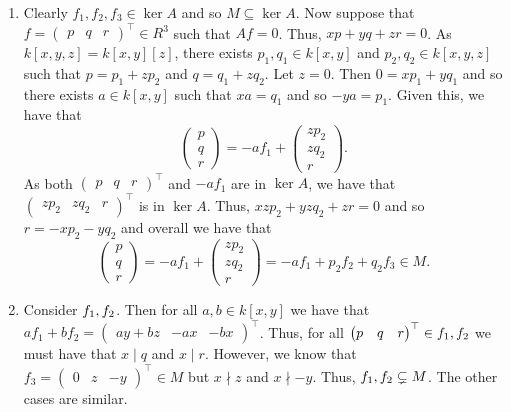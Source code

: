 \documentclass[letterpaper, 11pt, oneside]{book}
\begin{document}
\begin{sol}\label{ex:UAG_5.1.2}
  \begin{enumerate}
    \item Clearly $f_{1}, f_{2}, f_{3} \in \ker A$ and so $M \subseteq \ker A$.
          Now suppose that $f = \begin{pmatrix} p & q & r \end{pmatrix}^{\top} \in R^{3}$ such that $Af = 0$.
          Thus, $xp + yq + zr = 0$.
          As $k[x, y, z] = k[x, y][z]$, there exists $p_{1}, q_{1} \in k[x, y]$ and $p_{2}, q_{2} \in k[x, y, z]$ such that $p = p_{1} + z p_{2}$ and $q = q_{1} + z q_{2}$.
          Let $z = 0$.
          Then $0 = x p_{1} + y q_{1}$ and so there exists $a \in k[x, y]$ such that $xa = q_{1}$ and so $-ya = p_{1}$.
          Given this, we have that
          \[
          \begin{pmatrix}
            p \\ q \\ r
          \end{pmatrix}
          =
          -a f_{1} +
          \begin{pmatrix}
            z p_{2} \\ z q_{2} \\ r
          \end{pmatrix}.
          \]
          As both $\begin{pmatrix} p & q & r \end{pmatrix}^{\top}$ and $-a f_{1}$ are in $\ker A$, we have that $\begin{pmatrix} z p_{2} & z q_{2} & r \end{pmatrix}^{\top}$ is in $\ker A$.
          Thus, $xzp_{2} + yzq_{2} + zr = 0$ and so $r = -xp_{2} - y q_{2}$ and overall we have that
          \[
          \begin{pmatrix}
            p \\ q \\ r
          \end{pmatrix}
          =
          -a f_{1} +
          \begin{pmatrix}
            z p_{2} \\ z q_{2} \\ r
          \end{pmatrix}
          = -a f_{1} + p_{2} f_{2} + q_{2} f_{3} \in M.
          \]
    \item Consider $\gen{f_{1}, f_{2}}$.
          Then for all $a, b \in k[x, y]$ we have that $a f_{1} + b f_{2} = \begin{pmatrix} a y + b z & -a x & - b x \end{pmatrix}^{\top}$.
          Thus, for all $\begin{pmatrix} p & q & r \end{pmatrix}^{\top} \in \gen{f_{1}, f_{2}}$ we must have that $x \mid q$ and $x \mid r$.
          However, we know that $f_{3} = \begin{pmatrix} 0 & z & -y \end{pmatrix}^{\top} \in M$ but $x \nmid z$ and $x \nmid -y$.
          Thus, $\gen{f_{1}, f_{2}} \subsetneq M$.
          The other cases are similar.


\end{enumerate}
\end{sol}
\end{document}

